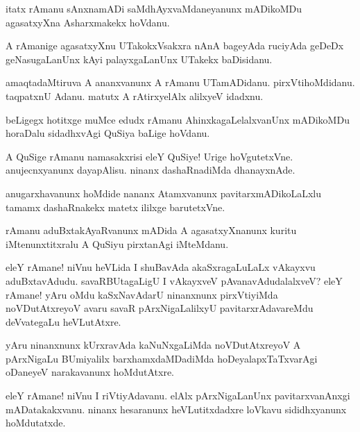 \begin{mng}
itatx rAmanu sAnxnamADi saMdhAyxvaMdaneyanunx mADikoMDu agasatxyXna Asharxmakekx hoVdanu.
\end{mng}

\begin{mng}
A rAmanige agasatxyXnu UTakokxVsakxra nAnA bageyAda ruciyAda geDeDx geNasugaLanUnx kAyi palayxgaLanUnx UTakekx baDisidanu.
\end{mng}

\begin{mng}
amaqtadaMtiruva A ananxvanunx A rAmanu UTamADidanu. pirxVtihoMdidanu. taqpatxnU Adanu. matutx A rAtirxyelAlx alilxyeV idadxnu.
\end{mng}

\begin{mng}
beLigegx hotitxge muMce edudx rAmanu AhinxkagaLelalxvanUnx mADikoMDu horaDalu sidadhxvAgi QuSiya baLige hoVdanu.
\end{mng}

\begin{mng}
A QuSige rAmanu namasakxrisi eleY QuSiye! Urige hoVgutetxVne. anujecnxyanunx dayapAlisu. ninanx dashaRnadiMda dhanayxnAde.
\end{mng}

\begin{mng}
anugarxhavanunx hoMdide nananx Atamxvanunx pavitarxmADikoLaLxlu tamamx dashaRnakekx matetx ililxge barutetxVne.
\end{mng}

\begin{mng}
rAmanu aduBxtakAyaRvanunx mADida A agasatxyXnanunx kuritu iMtenunxtitxralu A QuSiyu pirxtanAgi iMteMdanu.
\end{mng}

\begin{mng}
eleY rAmane! niVnu heVLida I shuBavAda akaSxragaLuLaLx vAkayxvu aduBxtavAdudu. savaRBUtagaLigU I vAkayxveV pAvanavAdudalalxveV? eleY rAmane! yAru oMdu kaSxNavAdarU ninanxnunx pirxVtiyiMda noVDutAtxreyoV avaru savaR pArxNigaLalilxyU pavitarxrAdavareMdu deVvategaLu heVLutAtxre.
\end{mng}

\begin{mng}
yAru ninanxnunx kUrxravAda kaNuNxgaLiMda noVDutAtxreyoV A pArxNigaLu BUmiyalilx barxhamxdaMDadiMda hoDeyalapxTaTxvarAgi oDaneyeV narakavanunx hoMdutAtxre.
\end{mng}

\begin{mng}
eleY rAmane! niVnu I riVtiyAdavanu. elAlx pArxNigaLanUnx pavitarxvanAnxgi mADatakakxvanu. ninanx hesaranunx heVLutitxdadxre loVkavu sididhxyanunx  hoMdutatxde. 
\end{mng}

